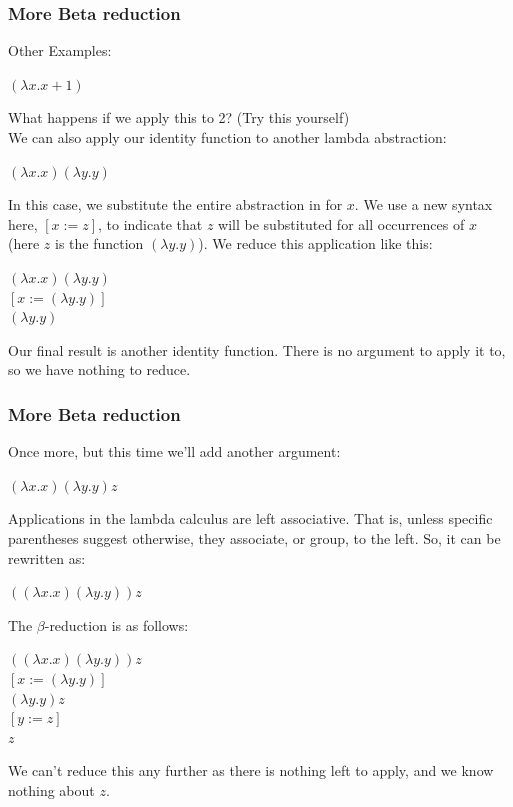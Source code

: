 \documentclass{beamer}
\begin{document}
\begin{frame} [fragile, label = test]

 \frametitle{More Beta reduction}
Other Examples: 
\pause
\begin{center}
$(\lambda x.x+1)$
\end{center}
What happens if we apply this to 2?  (Try this yourself)\\
\pause
We can also apply our identity function to another lambda abstraction:
\begin{center}
$(\lambda x.x)(\lambda y.y)$
\end{center}
\pause
In this case, we substitute the entire abstraction in for $x$. We use a new syntax here, $[x := z]$, to 
indicate that $z$ will be substituted for all occurrences of $x$ (here $z$ is the 
function $(\lambda y.y)$). We reduce this application like this:
\pause
\begin{center}
$(\lambda x.x)(\lambda y.y)$ \\

$[x  := (\lambda y.y)]$\\

\hspace{.4in}$(\lambda y.y)$\\
\end{center}
Our final result is another identity function. There is no argument to apply it to, so we have nothing to reduce.
\end{frame}
\begin{frame} [fragile, label = test]
\frametitle{More Beta reduction}
Once more, but this time we’ll add another argument:
\begin{center}
$(\lambda x.x)(\lambda y.y)z$
\end{center}
\pause
Applications in the lambda calculus are left associative. That is, unless specific parentheses suggest otherwise, they associate, or group, to the left. So, it can be rewritten as:
\begin{center}
$((\lambda x.x)(\lambda y.y)) z$
\end{center}
\pause
The $\beta$-reduction is as follows:
\begin{center}
$((\lambda x.x)(\lambda y.y)) z$ \\

\hspace{.22in}$[x := ( \lambda y. y) ] $\\

\hspace{.58in}$ (\lambda y.y) z $ \\

\hspace{.58in}$[y:= z ] $\\

\hspace{1in}$z$ \\
\end{center}
\pause
We can't reduce this any further as there is nothing left to apply, and we know nothing about $z$.
\end{frame}
\end{document}
